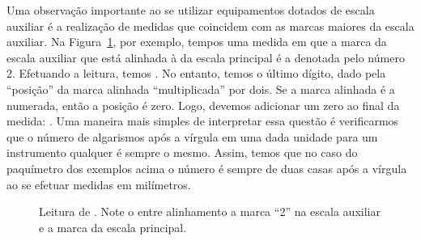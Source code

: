 Uma observação importante ao se utilizar equipamentos dotados de escala auxiliar é a realização de medidas que coincidem com as marcas maiores da escala auxiliar. Na Figura~\ref{Fig:PaquimetroLeituraZero}, por exemplo, tempos uma medida em que a marca da escala auxiliar que está alinhada à da escala principal é a denotada pelo número 2. Efetuando a leitura, temos . No entanto, temos o último dígito, dado pela ``posição'' da marca alinhada ``multiplicada'' por dois. Se a marca alinhada é a numerada, então a posição é zero. Logo, devemos adicionar um zero ao final da medida: . Uma maneira mais simples de interpretar essa questão é verificarmos que o número de algarismos após a vírgula em uma dada unidade para um instrumento qualquer é sempre o mesmo. Assim, temos que no caso do paquímetro dos exemplos acima o número é sempre de duas casas após a vírgula ao se efetuar medidas em milímetros.
\begin{figure}
\centering
{}
\caption{Leitura de . Note o entre alinhamento a  marca ``2'' na escala auxiliar e a marca da escala principal.\label{Fig:PaquimetroLeituraZero}}
\end{figure}

